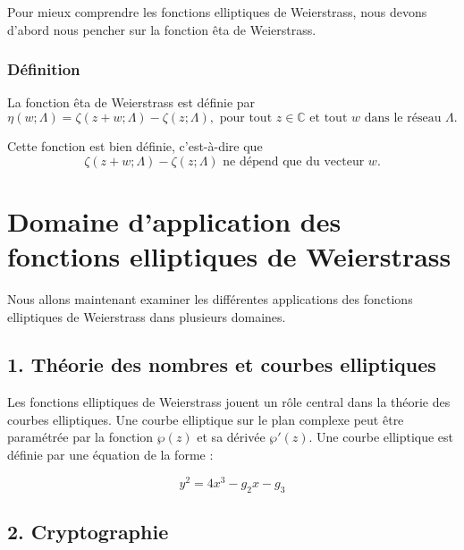 \documentclass[12pt]{article}
\begin{document}
                        Pour mieux comprendre les fonctions elliptiques de Weierstrass, nous devons d'abord nous pencher sur la fonction êta de Weierstrass.
                        
                        \subsubsection{Définition}
                        
                        La fonction êta de Weierstrass est définie par
                        \[
                        \eta (w; \Lambda) = \zeta (z + w; \Lambda) - \zeta (z; \Lambda), \text{ pour tout } z \in \mathbb{C} \text{ et tout } w \text{ dans le réseau } \Lambda.
                        \]
                        
                        Cette fonction est bien définie, c'est-à-dire que
                        \[
                        \zeta (z + w; \Lambda) - \zeta (z; \Lambda) \text{ ne dépend que du vecteur } w.
                        \]
                        
                        \section{Domaine d'application des fonctions elliptiques de Weierstrass}
                        
                        Nous allons maintenant examiner les différentes applications des fonctions elliptiques de Weierstrass dans plusieurs domaines.
                        
                        \subsection*{1. Théorie des nombres et courbes elliptiques}
                        
                        Les fonctions elliptiques de Weierstrass jouent un rôle central dans la théorie des courbes elliptiques. Une courbe elliptique sur le plan complexe peut être paramétrée par la fonction $\wp(z)$ et sa dérivée $\wp'(z)$. Une courbe elliptique est définie par une équation de la forme :
                        
                        \[
                        y^2 = 4x^3 - g_2 x - g_3
                        \]
                        
                        \subsection*{2. Cryptographie}
                        
\end{document}

